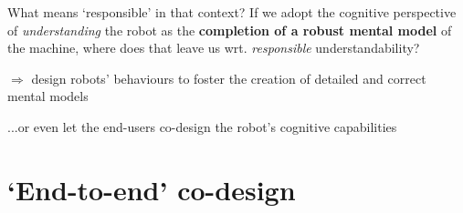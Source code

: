 \documentclass[xcolor=table,aspectratio=169]{beamer}
\begin{document}
\begin{frame}{What means `responsible' in that context?}
    If we adopt the cognitive perspective of \emph{understanding} the robot as
    the \textbf{completion of a robust mental model} of the machine, where does
    that leave us wrt. \emph{responsible} understandability?

    \pause

    $\Rightarrow$ design robots' behaviours to foster the creation of detailed
    and correct mental models

    \pause

    ...or even let the end-users co-design the robot's cognitive capabilities

\end{frame}

\section*{`End-to-end' co-design}

\end{document}
